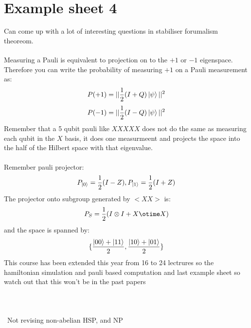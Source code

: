 \documentclass{article}
\begin{document}
\section{Example sheet 4}
Can come up with a lot of interesting questions in stabiliser forumalism theoreom. \\\\
Measuring a Pauli is equivalent to projection on to the $+ 1$ or $-1$ eigenspace. Therefore you can write the probability of measuring $+1$ on a Pauli measurement as:
$$
P(+1) = || \frac{1}{2}( I + Q) \ket{\psi}||^2 
$$
$$
P(-1) = || \frac{1}{2}(I - Q) \ket{\psi} ||^2
$$
Remember that a 5 qubit pauli like $XXXXX$ does not do the same as measuring each qubit in the $X$ basis, it does one measurmeent and projects the space into the half of the Hilbert space with that eigenvalue.\\\\
Remember pauli projector:
$$
P_{\ket{0}} = \frac{1}{2} ( I-Z), P_{\ket{1}} = \frac{1}{2} ( I + Z)
$$
The projector onto subgroup generated by $<XX>$ is:
$$
P_S = \frac{1}{2}( I \otimes I + X \otime X)
$$
and the space is spanned by:
$$
\{ \frac{\ket{00} + \ket{11}}{2}, \frac{\ket{10} + \ket{01}}{2}\}
$$
This course has been extended this year from 16 to 24 lectrures so the hamiltonian simulation and pauli based computation and last example sheet so watch out that this won't be in the past papers
\\\\\\\\\
Not revising non-abelian HSP, and NP
\end{document}

